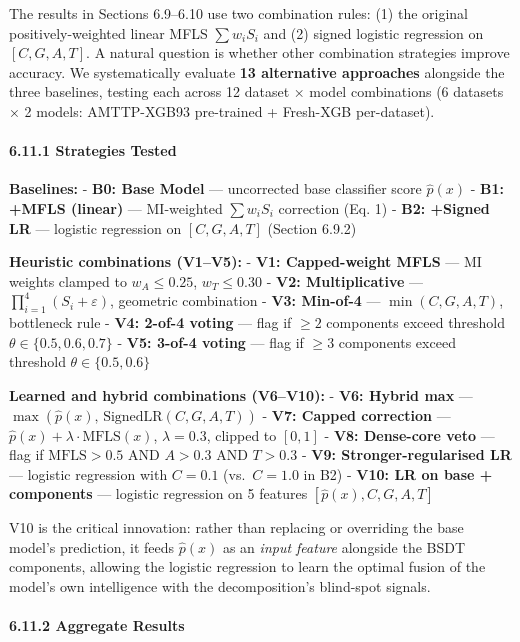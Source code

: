 \documentclass[
  11pt,
]{article}
\begin{document}
The results in Sections 6.9–6.10 use two combination rules: (1) the
original positively-weighted linear MFLS \(\sum w_i S_i\) and (2) signed
logistic regression on \([C, G, A, T]\). A natural question is whether
other combination strategies improve accuracy. We systematically
evaluate \textbf{13 alternative approaches} alongside the three
baselines, testing each across 12 dataset × model combinations (6
datasets × 2 models: AMTTP-XGB93 pre-trained + Fresh-XGB per-dataset).

\paragraph{6.11.1 Strategies Tested}\label{strategies-tested}

\textbf{Baselines:} - \textbf{B0: Base Model} — uncorrected base
classifier score \(\hat{p}(x)\) - \textbf{B1: +MFLS (linear)} —
MI-weighted \(\sum w_i S_i\) correction (Eq. 1) - \textbf{B2: +Signed
LR} — logistic regression on \([C, G, A, T]\) (Section 6.9.2)

\textbf{Heuristic combinations (V1–V5):} - \textbf{V1: Capped-weight
MFLS} — MI weights clamped to \(w_A \leq 0.25\), \(w_T \leq 0.30\) -
\textbf{V2: Multiplicative} — \(\prod_{i=1}^{4}(S_i + \varepsilon)\),
geometric combination - \textbf{V3: Min-of-4} — \(\min(C, G, A, T)\),
bottleneck rule - \textbf{V4: 2-of-4 voting} — flag if \(\geq 2\)
components exceed threshold \(\theta \in \{0.5, 0.6, 0.7\}\) -
\textbf{V5: 3-of-4 voting} — flag if \(\geq 3\) components exceed
threshold \(\theta \in \{0.5, 0.6\}\)

\textbf{Learned and hybrid combinations (V6–V10):} - \textbf{V6: Hybrid
max} — \(\max(\hat{p}(x),\, \text{SignedLR}(C,G,A,T))\) - \textbf{V7:
Capped correction} — \(\hat{p}(x) + \lambda \cdot \text{MFLS}(x)\),
\(\lambda = 0.3\), clipped to \([0,1]\) - \textbf{V8: Dense-core veto} —
flag if \(\text{MFLS} > 0.5\) AND \(A > 0.3\) AND \(T > 0.3\) -
\textbf{V9: Stronger-regularised LR} — logistic regression with
\(C = 0.1\) (vs.~\(C = 1.0\) in B2) - \textbf{V10: LR on base +
components} — logistic regression on 5 features
\([\hat{p}(x), C, G, A, T]\)

V10 is the critical innovation: rather than replacing or overriding the
base model’s prediction, it feeds \(\hat{p}(x)\) as an \emph{input
feature} alongside the BSDT components, allowing the logistic regression
to learn the optimal fusion of the model’s own intelligence with the
decomposition’s blind-spot signals.

\paragraph{6.11.2 Aggregate Results}\label{aggregate-results}
\end{document}
